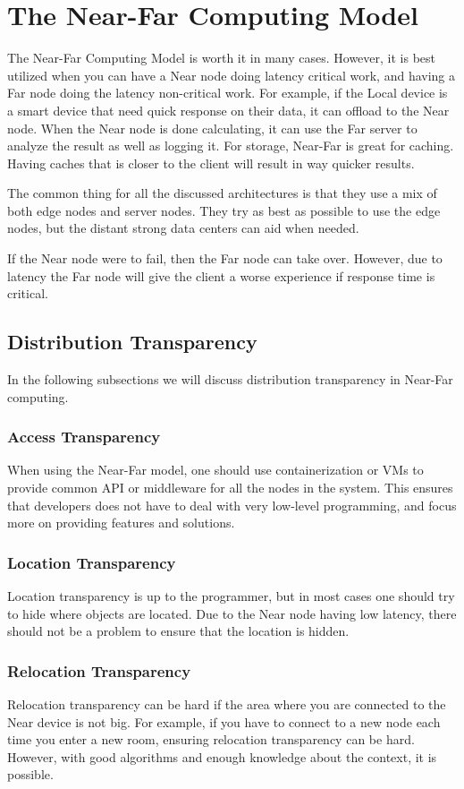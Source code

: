 \section{The Near-Far Computing Model}
The Near-Far Computing Model is worth it in many cases. However, it is best utilized when you can have a Near node doing latency critical work, and having a Far node doing the latency non-critical work. For example, if the Local device is a smart device that need quick response on their data, it can offload to the Near node. When the Near node is done calculating, it can use the Far server to analyze the result as well as logging it. For storage, Near-Far is great for caching. Having caches that is closer to the client will result in way quicker results.

The common thing for all the discussed architectures is that they use a mix of both edge nodes and server nodes. They try as best as possible to use the edge nodes, but the distant strong data centers can aid when needed. 

If the Near node were to fail, then the Far node can take over. However, due to latency the Far node will give the client a worse experience if response time is critical. 

\subsection{Distribution Transparency}
In the following subsections we will discuss distribution transparency in Near-Far computing.

\subsubsection{Access Transparency}
When using the Near-Far model, one should use containerization or VMs to provide common API or middleware for all the nodes in the system. This ensures that developers does not have to deal with very low-level programming, and focus more on providing features and solutions.

\subsubsection{Location Transparency}
Location transparency is up to the programmer, but in most cases one should try to hide where objects are located. Due to the Near node having low latency, there should not be a problem to ensure that the location is hidden.

\subsubsection{Relocation Transparency}
Relocation transparency can be hard if the area where you are connected to the Near device is not big. For example, if you have to connect to a new node each time you enter a new room, ensuring relocation transparency can be hard. However, with good algorithms and enough knowledge about the context, it is possible. 

